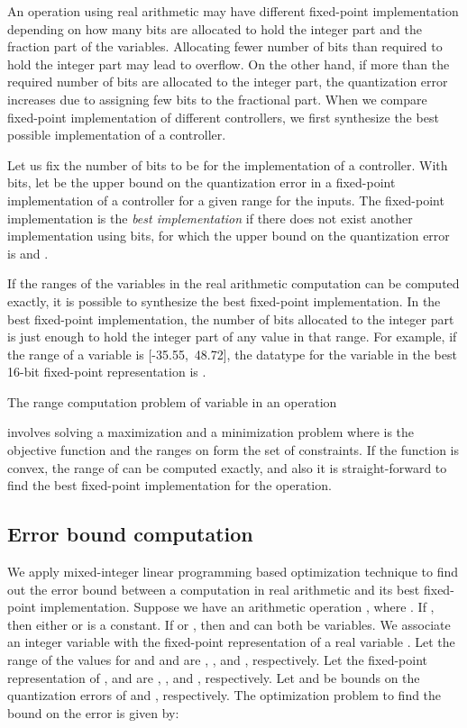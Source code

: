 \documentclass{amsart}
\numberwithin{equation}{section}
\begin{document}
An operation using real arithmetic may have different fixed-point implementation depending on
how many bits are allocated to hold the integer part and the fraction part of the variables. 
Allocating fewer number of bits than required to hold the integer part may lead to overflow. 
On the other hand, if more than the required number of bits are allocated to the integer part, 
the quantization error increases due to assigning few bits to the fractional part. 
When we compare fixed-point implementation of different controllers, we first synthesize the best 
possible implementation of a controller. 

Let us fix the number of bits to be  for the implementation of a controller. 
With  bits, let  be the upper bound on the quantization error in a fixed-point implementation  of a controller
for a given range for the inputs. 
The fixed-point implementation  is the {\em best implementation} if  there 
does not exist another implementation  using  bits, 
for which the upper bound on the quantization error is  and .


If the ranges of the variables in the real arithmetic computation can be computed exactly,  
it is possible to synthesize the best fixed-point implementation. In the best fixed-point implementation,
the number of bits allocated to the integer part is just enough to hold the integer part of any value in that range.
For example, if the range of a variable is \mbox{[-35.55,~48.72]}, the datatype for the variable in the best
16-bit fixed-point representation is .  

The range computation problem
of variable  in an operation 

involves solving a maximization and a minimization
problem where  is the objective function and the ranges on  form the set of constraints.
If the function  is convex, the range of  can be computed exactly, and also it is straight-forward to find 
the best fixed-point implementation for the operation. 


\subsection{Error bound computation}

We apply mixed-integer linear programming based optimization technique to find out the error bound
between a computation in real arithmetic and its best fixed-point implementation.
Suppose we have an arithmetic operation , where . If , then
either  or  is a constant. If  or , then  and  can both be variables. 
We associate an integer variable  with the fixed-point representation of a real variable .
Let the range of the values for  and  and 
are , , and , respectively. Let the fixed-point representation of 
,  and  are , ,  and , 
respectively. Let  and  be bounds on the quantization errors of  and , respectively.
The optimization problem to find the bound on the error is given by:
\end{document}
